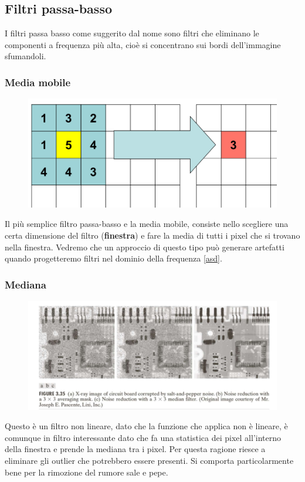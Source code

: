 \subsection{Filtri passa-basso}
I filtri passa basso come suggerito dal nome sono filtri che eliminano le componenti a frequenza più alta, cioè si concentrano sui bordi dell'immagine sfumandoli.
\subsubsection{Media mobile}
\begin{figure}
	\vspace{-.3cm}
	\centering
	\includegraphics[width=.9\linewidth]{Picture/Moving_Average}
\end{figure}
Il più semplice filtro passa-basso e la media mobile, consiste nello scegliere una certa dimensione del filtro (\textbf{finestra}) e fare la media di tutti i pixel che si trovano nella finestra. Vedremo che un approccio di questo tipo può generare artefatti quando progetteremo filtri nel dominio della frequenza \ref{asd}.
\pagebreak
\subsubsection{Mediana}
\begin{figure}
	\centering
	\includegraphics[width=.95\linewidth]{Picture/Median_Filter}
\end{figure}
Questo è un filtro non lineare, dato che la funzione che applica non è lineare, è comunque in filtro interessante dato che fa una statistica dei pixel all'interno della finestra e prende la mediana tra i pixel. Per questa ragione riesce a eliminare gli outlier che potrebbero essere presenti. Si comporta particolarmente bene per la rimozione del rumore sale e pepe.

